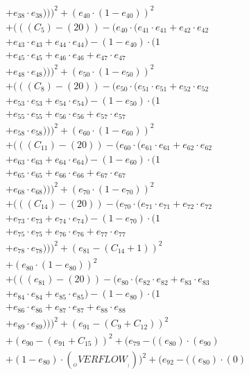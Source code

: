 \documentclass[10pt, a4paper]{article}
\begin{document}
\begin{align*}
& + e_{38} \cdot e_{38})))^{2} + (e_{40} \cdot (1 - e_{40}))^{2} \\
& + (((C_{5}) - (20)) - (e_{40} \cdot (e_{41} \cdot e_{41} + e_{42} \cdot e_{42} \\
& + e_{43} \cdot e_{43} + e_{44} \cdot e_{44}) - (1 - e_{40}) \cdot (1 \\
& + e_{45} \cdot e_{45} + e_{46} \cdot e_{46} + e_{47} \cdot e_{47} \\
& + e_{48} \cdot e_{48})))^{2} + (e_{50} \cdot (1 - e_{50}))^{2} \\
& + (((C_{8}) - (20)) - (e_{50} \cdot (e_{51} \cdot e_{51} + e_{52} \cdot e_{52} \\
& + e_{53} \cdot e_{53} + e_{54} \cdot e_{54}) - (1 - e_{50}) \cdot (1 \\
& + e_{55} \cdot e_{55} + e_{56} \cdot e_{56} + e_{57} \cdot e_{57} \\
& + e_{58} \cdot e_{58})))^{2} + (e_{60} \cdot (1 - e_{60}))^{2} \\
& + (((C_{11}) - (20)) - (e_{60} \cdot (e_{61} \cdot e_{61} + e_{62} \cdot e_{62} \\
& + e_{63} \cdot e_{63} + e_{64} \cdot e_{64}) - (1 - e_{60}) \cdot (1 \\
& + e_{65} \cdot e_{65} + e_{66} \cdot e_{66} + e_{67} \cdot e_{67} \\
& + e_{68} \cdot e_{68})))^{2} + (e_{70} \cdot (1 - e_{70}))^{2} \\
& + (((C_{14}) - (20)) - (e_{70} \cdot (e_{71} \cdot e_{71} + e_{72} \cdot e_{72} \\
& + e_{73} \cdot e_{73} + e_{74} \cdot e_{74}) - (1 - e_{70}) \cdot (1 \\
& + e_{75} \cdot e_{75} + e_{76} \cdot e_{76} + e_{77} \cdot e_{77} \\
& + e_{78} \cdot e_{78})))^{2} + (e_{81} - (C_{14} + 1))^{2} \\
& + (e_{80} \cdot (1 - e_{80}))^{2} \\
& + (((e_{81}) - (20)) - (e_{80} \cdot (e_{82} \cdot e_{82} + e_{83} \cdot e_{83} \\
& + e_{84} \cdot e_{84} + e_{85} \cdot e_{85}) - (1 - e_{80}) \cdot (1 \\
& + e_{86} \cdot e_{86} + e_{87} \cdot e_{87} + e_{88} \cdot e_{88} \\
& + e_{89} \cdot e_{89})))^{2} + (e_{91} - (C_{9} + C_{12}))^{2} \\
& + (e_{90} - (e_{91} + C_{15}))^{2} + (e_{79} - ((e_{80})  \cdot  (e_{90}) \\
& + (1 - e_{80})  \cdot  (__OVERFLOW__)))^{2} + (e_{92} - ((e_{80}) \cdot (0) \\

\end{align*}
\end{document}
